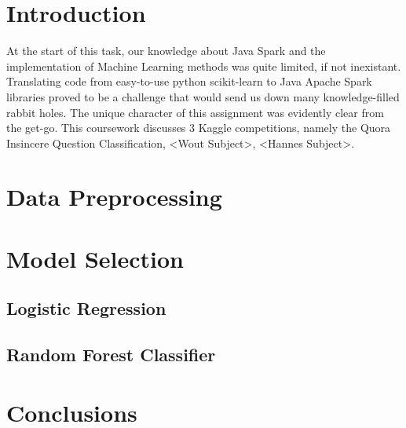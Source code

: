 
\section{Introduction} %
\label{sec:introduction}

At the start of this task, our knowledge about Java Spark and the implementation of Machine Learning methods was quite limited, if not inexistant. Translating code from easy-to-use python scikit-learn to Java Apache Spark libraries proved to be a challenge that would send us down many knowledge-filled rabbit holes. The unique character of this assignment was evidently clear from the get-go.
This coursework discusses 3 Kaggle competitions, namely the Quora Insincere Question Classification, <Wout Subject>, <Hannes Subject>. 



\section{Data Preprocessing}
\label{sec:preprocessing}



\section{Model Selection}
\subsection{Logistic Regression}
\subsection{Random Forest Classifier}

\section{Conclusions}
\label{sec:conclusions}

  

